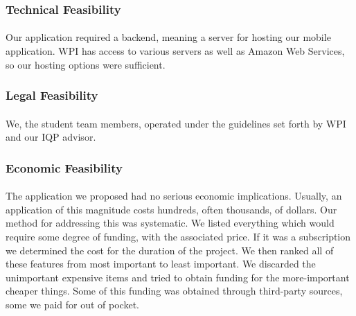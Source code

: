         \subsubsection{Technical Feasibility}
            \paragraph{}
            Our application required a backend, meaning a server for hosting our mobile application. WPI has access to various servers as well as Amazon Web Services, so our hosting options were sufficient.
        \subsubsection{Legal Feasibility}
            \paragraph{}
            We, the student team members, operated under the guidelines set forth by WPI and our IQP advisor.
        \subsubsection{Economic Feasibility}
            \paragraph{}
             The application we proposed had no serious economic implications. Usually, an application of this magnitude costs hundreds, often thousands, of dollars. Our method for addressing this was systematic. We listed everything which would require some degree of funding, with the associated price. If it was a subscription we determined the cost for  the duration of the project. We then ranked all of these features from most important to least important. We discarded the unimportant expensive items and tried to obtain funding for the more-important cheaper things. Some of this funding was obtained through third-party sources, some we paid for out of pocket. 
